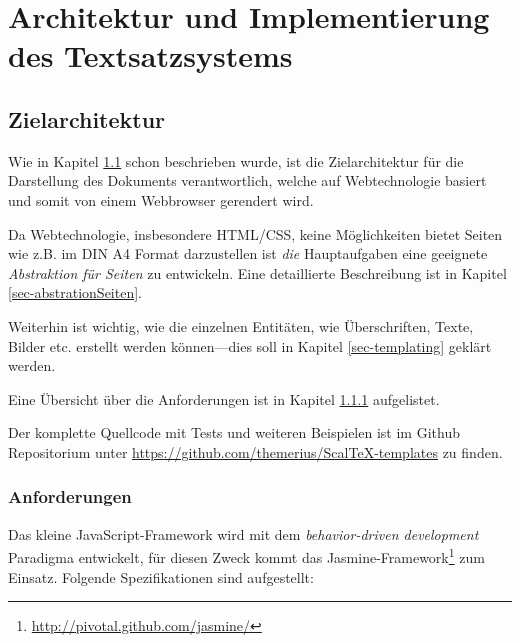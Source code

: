 \chapter{Architektur und Implementierung des Textsatzsystems}\label{ch-architektur}

\section{Zielarchitektur}\label{sec-zielarchitektur}

Wie in Kapitel \ref{sec-zielarchitektur} schon beschrieben wurde, ist die
Zielarchitektur für die Darstellung des Dokuments verantwortlich, welche
auf Webtechnologie basiert und somit von einem Webbrowser gerendert wird.

Da Webtechnologie, insbesondere HTML/CSS, keine Möglichkeiten bietet
Seiten wie z.B. im DIN A4 Format darzustellen ist \emph{die}
Hauptaufgaben eine geeignete \emph{Abstraktion für Seiten} zu entwickeln.
Eine detaillierte Beschreibung ist in Kapitel \ref{sec-abstrationSeiten}.

Weiterhin ist wichtig, wie die einzelnen Entitäten, wie Überschriften,
Texte, Bilder etc. erstellt werden können---dies soll in Kapitel
\ref{sec-templating} geklärt werden.

Eine Übersicht über die Anforderungen ist in Kapitel
\ref{sec-ziel_anforderungen} aufgelistet.

Der komplette Quellcode mit Tests und weiteren Beispielen ist im
Github Repositorium unter \url{https://github.com/themerius/ScalTeX-templates}
zu finden.

\subsection{Anforderungen}\label{sec-ziel_anforderungen}

Das kleine JavaScript-Framework wird mit dem
\emph{behavior-driven development} Paradigma entwickelt,
für diesen Zweck kommt das
Jasmine-Framework\footnote{\url{http://pivotal.github.com/jasmine/}}
zum Einsatz. Folgende Spezifikationen sind aufgestellt:


